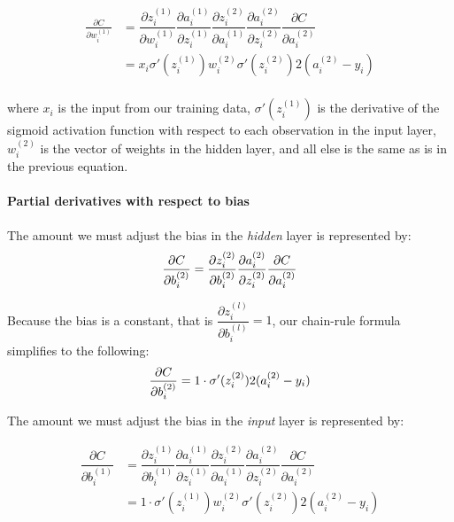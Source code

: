     \begin{align*}
\frac{\partial{C}}{\partial{w_i^{(1)}}}    &= \dfrac{\partial{z_i^{(1)}}}{\partial{w_i^{(1)}}} \dfrac{\partial{a_i^{(1)}}}{\partial{z_i^{(1)}}}  \dfrac{\partial{z_i^{(2)}}}{\partial{a_i^{(1)}}}
     \dfrac{\partial{a_i^{(2)}}}{\partial{z_i^{(2)}}}
     \dfrac{\partial{C}}{\partial{a_i^{(2)}}} \\    
&= x_i \sigma'(z_i^{(1)}) w_i^{(2)} \sigma'(z_i^{(2)}) 2(a_i^{(2)}-y_i) \\
     \end{align*}

where \(x_i\) is the input from our training data,
\(\sigma'(z_i^{(1)})\) is the derivative of the sigmoid activation
function with respect to each observation in the input layer,
\(w_i^{(2)}\) is the vector of weights in the hidden layer, and all else
is the same as is in the previous equation.


\hypertarget{partial-derivatives-with-respect-to-bias}{%
\paragraph{Partial derivatives with respect to
bias}\label{partial-derivatives-with-respect-to-bias}}

The amount we must adjust the bias in the \emph{hidden} layer is
represented by: \[
\frac{\partial{C}}{\partial{b_i^{(2)}}}  =  \dfrac{\partial{z_i^{(2)}}}{\partial{b_i^{(2)}}}
     \dfrac{\partial{a_i^{(2)}}}{\partial{z_i^{(2)}}}
     \dfrac{\partial{C}}{\partial{a_i^{(2)}}} \\
\]

Because the bias is a constant, that is
\(\dfrac{\partial{z_i^{(l)}}}{\partial{b_i^{(l)}}} = 1\), our chain-rule
formula simplifies to the following: \[
\frac{\partial{C}}{\partial{b_i^{(2)}}} = 1 \cdot \sigma'(z_i^{(2)}) 2(a_i^{(2)}-y_i) \\
\]

The amount we must adjust the bias in the \emph{input} layer is
represented by:

    \begin{align*}
\dfrac{\partial{C}}{\partial{b_i^{(1)}}} 
& = \dfrac{\partial{z_i^{(1)}}}{\partial{b_i^{(1)}}} \dfrac{\partial{a_i^{(1)}}}{\partial{z_i^{(1)}}}  \dfrac{\partial{z_i^{(2)}}}{\partial{a_i^{(1)}}}
     \dfrac{\partial{a_i^{(2)}}}{\partial{z_i^{(2)}}}
     \dfrac{\partial{C}}{\partial{a_i^{(2)}}} \\ \nonumber
& = 1 \cdot \sigma'(z_i^{(1)}) w_i^{(2)} \sigma'(z_i^{(2)}) 2(a_i^{(2)}-y_i) \nonumber
    \end{align*}
